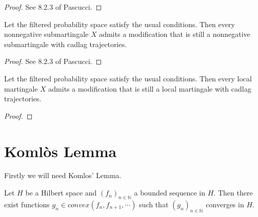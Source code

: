 \begin{proof}
  See 8.2.3 of Pascucci.
\end{proof}


\begin{lemma}\label{lem:exists_cadlag_mod_of_nonneg_submg}
  Let the filtered probability space satisfy the usual conditions.
  Then every nonnegative submartingale $X$ admits a modification that is still a nonnegative submartingale with cadlag trajectories.
\end{lemma}

\begin{proof}
  See 8.2.3 of Pascucci.
\end{proof}


\begin{lemma}\label{lem:exists_cadlag_mod_of_local_mg}
  Let the filtered probability space satisfy the usual conditions.
  Then every local martingale $X$ admits a modification that is still a local martingale with cadlag trajectories.
\end{lemma}

\begin{proof}
\end{proof}



\section{Komlòs Lemma}



Firstly we will need Komlos' Lemma.


\begin{lemma}\label{lem:komlos_aux}
  Let $H$ be a Hilbert space and $(f_n)_{n\in\mathbb{N}}$ a bounded sequence in $H$. Then there exist functions $g_n\in convex(f_n,f_{n+1},\cdots)$ such that $(g_n)_{n\in\mathbb{N}}$ converges in $H$.
\end{lemma}

